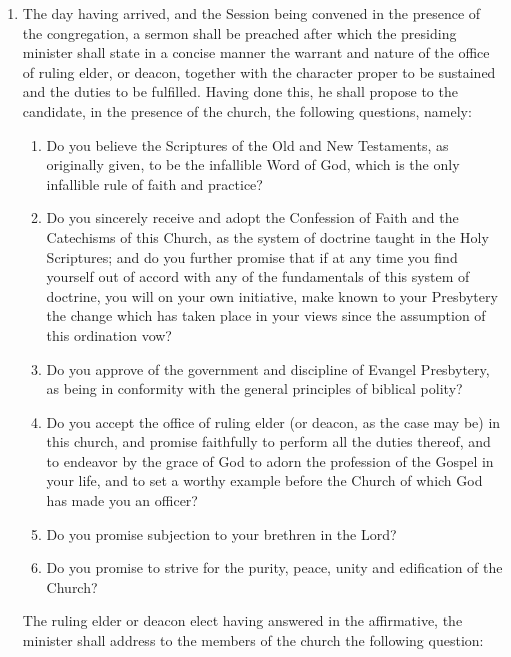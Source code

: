 \documentclass[
]{book}
\providecommand{\tightlist}{%
  \setlength{\itemsep}{0pt}\setlength{\parskip}{0pt}}
\begin{document}
\begin{enumerate}
\def\labelenumi{\arabic{enumi}.}
\setcounter{enumi}{3}
\item
  \protect\hypertarget{26.4}{\href{}{}}The day having arrived, and the Session being convened in the presence of the congregation, a sermon shall be preached after which the presiding minister shall state in a concise manner the warrant and nature of the office of ruling elder, or deacon, together with the character proper to be sustained and the duties to be fulfilled. Having done this, he shall propose to the candidate, in the presence of the church, the following questions, namely:

  \begin{enumerate}
  \def\labelenumii{\alph{enumii}.}
  \tightlist
  \item
    Do you believe the Scriptures of the Old and New Testaments, as originally given, to be the infallible Word of God, which is the only infallible rule of faith and practice?
  \item
    Do you sincerely receive and adopt the Confession of Faith and the Catechisms of this Church, as the system of doctrine taught in the Holy Scriptures; and do you further promise that if at any time you find yourself out of accord with any of the fundamentals of this system of doctrine, you will on your own initiative, make known to your Presbytery the change which has taken place in your views since the assumption of this ordination vow?
  \item
    Do you approve of the government and discipline of Evangel Presbytery, as being in conformity with the general principles of biblical polity?
  \item
    Do you accept the office of ruling elder (or deacon, as the case may be) in this church, and promise faithfully to perform all the duties thereof, and to endeavor by the grace of God to adorn the profession of the Gospel in your life, and to set a worthy example before the Church of which God has made you an officer?
  \item
    Do you promise subjection to your brethren in the Lord?
  \item
    Do you promise to strive for the purity, peace, unity and edification of the Church?
  \end{enumerate}

  The ruling elder or deacon elect having answered in the affirmative, the minister shall address to the members of the church the following question:


\end{enumerate}
\end{document}
